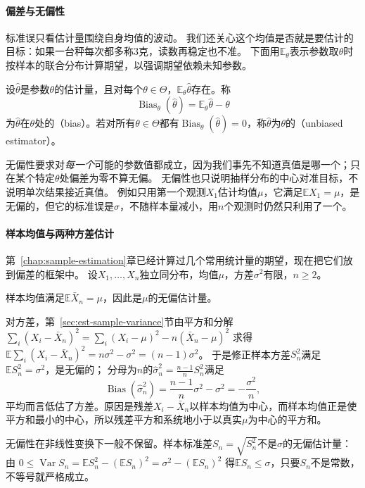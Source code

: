 \paragraph{偏差与无偏性}
标准误只看估计量围绕自身均值的波动。
我们还关心这个均值是否就是要估计的目标：如果一台秤每次都多称$3$克，读数再稳定也不准。
下面用$\mathbb{E}_\theta$表示参数取$\theta$时按样本的联合分布计算期望，以强调期望依赖未知参数。

\begin{definition}[偏差与无偏估计量]
\label{def:samp-bias}
设$\hat\theta$是参数$\theta$的估计量，且对每个$\theta\in\Theta$，$\mathbb{E}_\theta\hat\theta$存在。称
\[
  \operatorname{Bias}_\theta(\hat\theta)=\mathbb{E}_\theta\hat\theta-\theta
\]
为$\hat\theta$在$\theta$处的（bias）。若对所有$\theta\in\Theta$都有$\operatorname{Bias}_\theta(\hat\theta)=0$，称$\hat\theta$为$\theta$的（unbiased estimator）。
\end{definition}

无偏性要求对\emph{每一个}可能的参数值都成立，因为我们事先不知道真值是哪一个；只在某个特定$\theta$处偏差为零不算无偏。
无偏性也只说明抽样分布的中心对准目标，不说明单次结果接近真值。
例如只用第一个观测$X_1$估计均值$\mu$，它满足$\mathbb{E}X_1=\mu$，是无偏的，但它的标准误是$\sigma$，不随样本量减小，用$n$个观测时仍然只利用了一个。

\paragraph{样本均值与两种方差估计}
第~\ref{chap:sample-estimation}章已经计算过几个常用统计量的期望，现在把它们放到偏差的框架中。
设$X_1,\dots,X_n$独立同分布，均值$\mu$，方差$\sigma^2$有限，$n\geq2$。

样本均值满足$\mathbb{E}\bar X_n=\mu$，因此是$\mu$的无偏估计量。

对方差，第~\ref{sec:est-sample-variance}节由平方和分解
$\sum_i(X_i-\bar X_n)^2=\sum_i(X_i-\mu)^2-n(\bar X_n-\mu)^2$
求得$\mathbb{E}\sum_i(X_i-\bar X_n)^2=n\sigma^2-\sigma^2=(n-1)\sigma^2$。
于是修正样本方差$S_n^2$满足$\mathbb{E}S_n^2=\sigma^2$，是无偏的；
分母为$n$的$\hat\sigma_n^2=\frac{n-1}{n}S_n^2$满足
\[
  \operatorname{Bias}(\hat\sigma_n^2)=\frac{n-1}{n}\sigma^2-\sigma^2=-\frac{\sigma^2}{n},
\]
平均而言低估了方差。原因是残差$X_i-\bar X_n$以样本均值为中心，而样本均值正是使平方和最小的中心，所以残差平方和系统地小于以真实$\mu$为中心的平方和。

无偏性在非线性变换下一般不保留。样本标准差$S_n=\sqrt{S_n^2}$不是$\sigma$的无偏估计量：由
$0\leq\operatorname{Var}S_n=\mathbb{E}S_n^2-(\mathbb{E}S_n)^2=\sigma^2-(\mathbb{E}S_n)^2$
得$\mathbb{E}S_n\leq\sigma$，只要$S_n$不是常数，不等号就严格成立。

